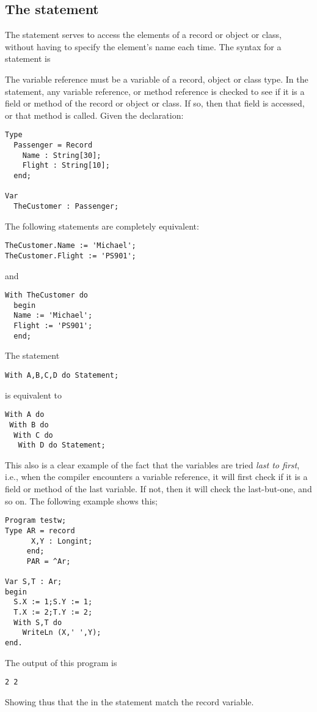 \subsection{The  statement}
\label{se:With} 
The  statement serves to access the elements of a record
or object or class, without having to specify the element's name each time.
The syntax for a  statement is

The variable reference must be a variable of a record, object or class type.
In the  statement, any variable reference, or method reference is
checked to see if it is a field or method of the record or object or class.
If so, then that field is accessed, or that method is called.
Given the declaration:
\begin{verbatim}
Type 
  Passenger = Record
    Name : String[30];
    Flight : String[10];
  end;

Var 
  TheCustomer : Passenger;
\end{verbatim}
The following statements are completely equivalent:
\begin{verbatim}
TheCustomer.Name := 'Michael';
TheCustomer.Flight := 'PS901';
\end{verbatim}
and
\begin{verbatim}
With TheCustomer do
  begin
  Name := 'Michael';
  Flight := 'PS901';
  end;
\end{verbatim}
The statement
\begin{verbatim}
With A,B,C,D do Statement;
\end{verbatim}
is equivalent to
\begin{verbatim}
With A do
 With B do
  With C do
   With D do Statement;
\end{verbatim}
This also is a clear example of the fact that the variables are tried {\em last
to first}, i.e., when the compiler encounters a variable reference, it will
first check if it is a field or method of the last variable. If not, then it
will check the last-but-one, and so on.
The following example shows this;
\begin{verbatim}
Program testw;
Type AR = record
      X,Y : Longint;
     end;
     PAR = ^Ar;

Var S,T : Ar;
begin
  S.X := 1;S.Y := 1;
  T.X := 2;T.Y := 2;
  With S,T do
    WriteLn (X,' ',Y);
end.
\end{verbatim}
The output of this program is
\begin{verbatim}
2 2
\end{verbatim}
Showing thus that the  in the  statement match the
 record variable.

